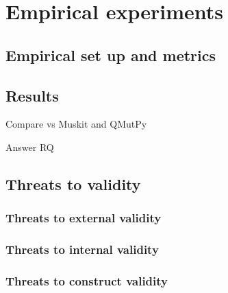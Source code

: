 \section{Empirical experiments}

\subsection{Empirical set up and metrics}

\subsection{Results}

Compare vs Muskit and QMutPy\newline

Answer RQ

\subsection{Threats to validity}

\subsubsection{Threats to external validity}
\subsubsection{Threats to internal validity}
\subsubsection{Threats to construct validity}